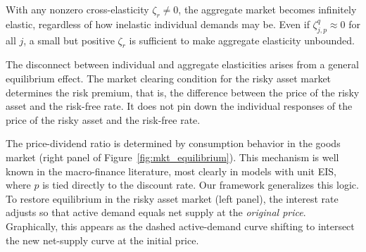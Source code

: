 With any nonzero cross-elasticity $\zeta_r \neq 0$, the aggregate market becomes infinitely elastic, regardless of how inelastic individual demands may be.
Even if $\zeta_{j,p}^q \approx 0$ for all $j$, a small but positive $\zeta_r$ is sufficient to make aggregate elasticity unbounded.

The disconnect between individual and aggregate elasticities arises from a general equilibrium effect.
The market clearing condition for the risky asset market determines the risk premium, that is, the difference between the price of the risky asset and the risk-free rate.
It does not pin down the individual responses of the price of the risky asset and the risk-free rate.

The price-dividend ratio is determined by consumption behavior in the goods market (right panel of Figure~\ref{fig:mkt_equilibrium}).
This mechanism is well known in the macro-finance literature, most clearly in models with unit EIS, where $p$ is tied directly to the discount rate.
Our framework generalizes this logic.
To restore equilibrium in the risky asset market (left panel), the interest rate adjusts so that active demand equals net supply at the \textit{original price}.
Graphically, this appears as the dashed active-demand curve shifting to intersect the new net-supply curve at the initial price.

